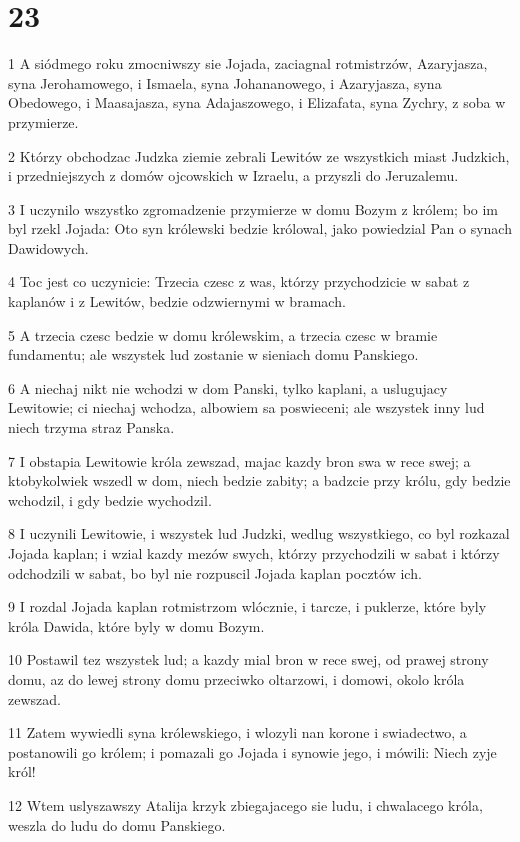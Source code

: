\chapter{23}

\par 1 A siódmego roku zmocniwszy sie Jojada, zaciagnal rotmistrzów, Azaryjasza, syna Jerohamowego, i Ismaela, syna Johananowego, i Azaryjasza, syna Obedowego, i Maasajasza, syna Adajaszowego, i Elizafata, syna Zychry, z soba w przymierze.
\par 2 Którzy obchodzac Judzka ziemie zebrali Lewitów ze wszystkich miast Judzkich, i przedniejszych z domów ojcowskich w Izraelu, a przyszli do Jeruzalemu.
\par 3 I uczynilo wszystko zgromadzenie przymierze w domu Bozym z królem; bo im byl rzekl Jojada: Oto syn królewski bedzie królowal, jako powiedzial Pan o synach Dawidowych.
\par 4 Toc jest co uczynicie: Trzecia czesc z was, którzy przychodzicie w sabat z kaplanów i z Lewitów, bedzie odzwiernymi w bramach.
\par 5 A trzecia czesc bedzie w domu królewskim, a trzecia czesc w bramie fundamentu; ale wszystek lud zostanie w sieniach domu Panskiego.
\par 6 A niechaj nikt nie wchodzi w dom Panski, tylko kaplani, a uslugujacy Lewitowie; ci niechaj wchodza, albowiem sa poswieceni; ale wszystek inny lud niech trzyma straz Panska.
\par 7 I obstapia Lewitowie króla zewszad, majac kazdy bron swa w rece swej; a ktobykolwiek wszedl w dom, niech bedzie zabity; a badzcie przy królu, gdy bedzie wchodzil, i gdy bedzie wychodzil.
\par 8 I uczynili Lewitowie, i wszystek lud Judzki, wedlug wszystkiego, co byl rozkazal Jojada kaplan; i wzial kazdy mezów swych, którzy przychodzili w sabat i którzy odchodzili w sabat, bo byl nie rozpuscil Jojada kaplan pocztów ich.
\par 9 I rozdal Jojada kaplan rotmistrzom wlócznie, i tarcze, i puklerze, które byly króla Dawida, które byly w domu Bozym.
\par 10 Postawil tez wszystek lud; a kazdy mial bron w rece swej, od prawej strony domu, az do lewej strony domu przeciwko oltarzowi, i domowi, okolo króla zewszad.
\par 11 Zatem wywiedli syna królewskiego, i wlozyli nan korone i swiadectwo, a postanowili go królem; i pomazali go Jojada i synowie jego, i mówili: Niech zyje król!
\par 12 Wtem uslyszawszy Atalija krzyk zbiegajacego sie ludu, i chwalacego króla, weszla do ludu do domu Panskiego.
